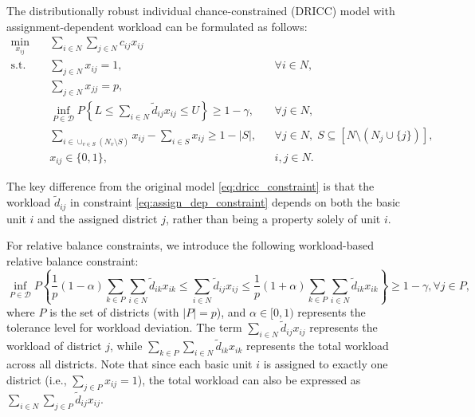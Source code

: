 \documentclass[preprint,12pt,authoryear]{elsarticle}
\begin{document}
The distributionally robust individual chance-constrained (DRICC) model with assignment-dependent workload can be formulated as follows:
\begin{align}
\min_{x_{ij}} \quad & \sum_{i \in N} \sum_{j \in N} c_{ij} x_{ij} \label{eq:assign_dep_obj} \\
\text{s.t.} \quad & \sum_{j \in N} x_{ij} = 1, && \forall i \in N, \label{eq:assign_dep_assign} \\
& \sum_{j \in N} x_{jj} = p, \label{eq:assign_dep_districts} \\
& \inf_{P \in \mathcal{D}} P \left\{L \leqslant \sum_{i \in N} \tilde{d}_{ij} x_{ij} \leqslant U \right\} \geqslant 1 - \gamma, && \forall j \in N, \label{eq:assign_dep_constraint} \\
& \sum_{i \in \cup_{v \in S}(N_v \setminus S)} x_{ij} - \sum_{i \in S} x_{ij} \geqslant 1 - |S|, && \forall j \in N, \; S \subseteq [N \setminus (N_j \cup \{j\})], \label{eq:assign_dep_contiguity} \\
& x_{ij} \in \{0,1\}, && i,j \in N. \label{eq:assign_dep_binary}
\end{align}

The key difference from the original model \eqref{eq:dricc_constraint} is that the workload $\tilde{d}_{ij}$ in constraint \eqref{eq:assign_dep_constraint} depends on both the basic unit $i$ and the assigned district $j$, rather than being a property solely of unit $i$.

For relative balance constraints, we introduce the following workload-based relative balance constraint:
\begin{equation}
\inf_{P \in \mathcal{D}} P \left\{ \frac{1}{p}(1 - \alpha)\sum_{k \in P}\sum_{i \in N}\tilde{d}_{ik} x_{ik} \leqslant \sum_{i \in N} \tilde{d}_{ij} x_{ij} \leqslant \frac{1}{p}(1 + \alpha)\sum_{k \in P}\sum_{i \in N}\tilde{d}_{ik} x_{ik} \right\} \geqslant 1 - \gamma,  \forall j \in P,
\label{eq:assign_dep_relative_balance}
\end{equation}
where $P$ is the set of districts (with $|P|=p$), and $\alpha \in [0, 1)$ represents the tolerance level for workload deviation. The term $\sum_{i \in N} \tilde{d}_{ij} x_{ij}$ represents the workload of district $j$, while $\sum_{k \in P}\sum_{i \in N}\tilde{d}_{ik} x_{ik}$ represents the total workload across all districts. Note that since each basic unit $i$ is assigned to exactly one district (i.e., $\sum_{j \in P} x_{ij} = 1$), the total workload can also be expressed as $\sum_{i \in N} \sum_{j \in P} \tilde{d}_{ij} x_{ij}$.
\end{document}
